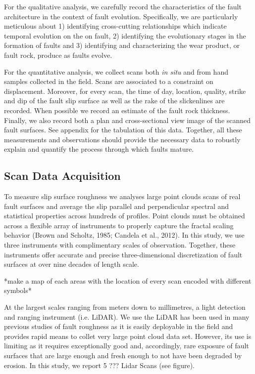 \documentclass[12pt,a4paper]{article}
\begin{document}
For the qualitative analysis, we carefully record the characteristics of the fault architecture in the context of fault evolution. Specifically, we are particularly meticulous about 1) identifying cross-cutting relationships which indicate temporal evolution on the on fault, 2) identifying the evolutionary stages in the formation of faults and 3) identifying and characterizing the wear product, or fault rock, produce as faults evolve. 

For the quantitative analysis, we collect scans both \textit{in situ} and from hand samples collected in the field. Scans are associated to a constraint on displacement. Moreover, for every scan, the time of day, location, quality, strike and dip of the fault slip surface as well as the rake of the slickenlines are recorded. When possible we record an estimate of the fault rock thickness. Finally, we also record both a plan and cross-sectional view image of the scanned fault surfaces.  See appendix for the tabulation of this data. Together, all these measurements and observations should provide the necessary data to robustly explain and quantify the process through which faults mature.

	\subsection{Scan Data Acquisition}

To measure slip surface roughness we analyses large point clouds scans of real fault surfaces and average the slip parallel and perpendicular spectral and statistical properties across hundreds of profiles. Point clouds must be obtained across a flexible array of instruments to properly capture the fractal scaling behavior (Brown and Scholtz, 1985; Candela et al., 2012). In this study, we use three instruments with complimentary scales of observation.  Together, these instruments offer accurate and precise three-dimensional discretization of fault surfaces at over nine decades of length scale.

*make a map of each areas with the location of every scan encoded with different symbols*

At the largest scales ranging from meters down to millimetres, a light detection and ranging instrument (i.e. LiDAR). We use the  LiDAR has been used in many previous studies of fault roughness as it is easily deployable in the field and provides rapid means to collet very large point cloud data set. However, its use is limiting as it requires exceptionally good and, accordingly, rare exposure of fault surfaces that are large enough and fresh enough to not have been degraded by erosion. In this study, we report 5 ??? Lidar Scans (see figure).
\end{document}
